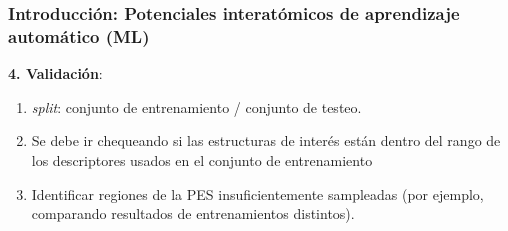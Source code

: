 \documentclass[aspectratio=169]{beamer}
\let\oldtextbf\textbf
\renewcommand{\textbf}[1]{\textcolor{nordblue}{\oldtextbf{#1}}}
\begin{document}
    \begin{frame}
        \frametitle{Introducción: Potenciales interatómicos de aprendizaje 
        automático (ML)}

        \textbf{4. Validación}:
        \begin{enumerate}
            \item \textit{split}: conjunto de entrenamiento / conjunto de testeo.
            \item Se debe ir chequeando si las estructuras de interés están dentro
                del rango de los descriptores usados en el conjunto de 
                entrenamiento
            \item Identificar regiones de la PES insuficientemente sampleadas 
                (por ejemplo, comparando resultados de entrenamientos distintos).
        \end{enumerate}

	\end{frame}
\end{document}
